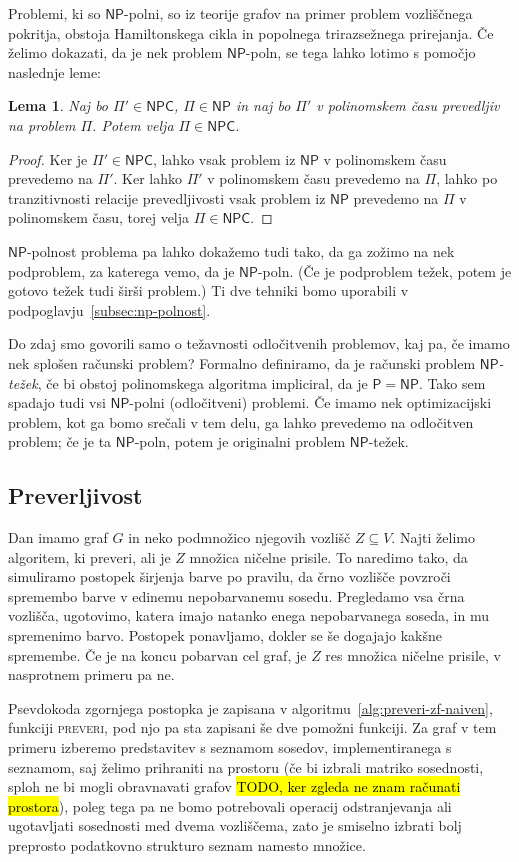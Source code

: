 \documentclass[12pt,a4paper,twoside]{article}
\theoremstyle{definition} %
\theoremstyle{plain} %
\newtheorem{lema}[definicija]{Lema}
\numberwithin{equation}{section}  %
\renewcommand{\P}{\ensuremath{\mathsf{P}}}
\newcommand{\NP}{\ensuremath{\mathsf{NP}}}
\newcommand{\NPC}{\ensuremath{\mathsf{NPC}}}
\begin{document}
Problemi, ki so $\NP$-polni, so iz teorije grafov na primer problem vozliščnega pokritja, obstoja Hamiltonskega cikla in popolnega trirazsežnega prirejanja. Če želimo dokazati, da je nek problem $\NP$-poln, se tega lahko lotimo s pomočjo naslednje leme:
\begin{lema}
    Naj bo $\Pi' \in \NPC$, $\Pi \in \NP$ in naj bo $\Pi'$ v polinomskem času prevedljiv na problem $\Pi$. Potem velja $\Pi \in \NPC$.
\end{lema}
\begin{proof}
    Ker je $\Pi' \in \NPC$, lahko vsak problem iz $\NP$ v polinomskem času prevedemo na $\Pi'$. Ker lahko $\Pi'$ v polinomskem času prevedemo na $\Pi$, lahko po tranzitivnosti relacije prevedljivosti vsak problem iz $\NP$ prevedemo na $\Pi$ v polinomskem času, torej velja $\Pi \in \NPC$.
\end{proof}
$\NP$-polnost problema pa lahko dokažemo tudi tako, da ga zožimo na nek podproblem, za katerega vemo, da je $\NP$-poln. (Če je podproblem težek, potem je gotovo težek tudi širši problem.)
Ti dve tehniki bomo uporabili v podpoglavju~\ref{subsec:np-polnost}.

Do zdaj smo govorili samo o težavnosti odločitvenih problemov, kaj pa, če imamo nek splošen računski problem? Formalno definiramo, da je računski problem \emph{$\NP$-težek}, če bi obstoj polinomskega algoritma impliciral, da je $\P = \NP$. Tako sem spadajo tudi vsi $\NP$-polni (odločitveni) problemi. Če imamo nek optimizacijski problem, kot ga bomo srečali v tem delu, ga lahko prevedemo na odločitven problem; če je ta $\NP$-poln, potem je originalni problem $\NP$-težek.

\subsection{Preverljivost}
Dan imamo graf $G$ in neko podmnožico njegovih vozlišč $Z \subseteq V$. Najti želimo algoritem, ki preveri, ali je $Z$ množica ničelne prisile. To naredimo tako, da simuliramo postopek širjenja barve po pravilu, da črno vozlišče povzroči spremembo barve v edinemu nepobarvanemu sosedu. Pregledamo vsa črna vozlišča, ugotovimo, katera imajo natanko enega nepobarvanega soseda, in mu spremenimo barvo. Postopek ponavljamo, dokler se še dogajajo kakšne spremembe. Če je na koncu pobarvan cel graf, je $Z$ res množica ničelne prisile, v nasprotnem primeru pa ne. 

Psevdokoda zgornjega postopka je zapisana v algoritmu~\ref{alg:preveri-zf-naiven}, funkciji \textsc{preveri}, pod njo pa sta zapisani še dve pomožni funkciji. Za graf v tem primeru izberemo predstavitev s seznamom sosedov, implementiranega s seznamom, saj želimo prihraniti na prostoru (če bi izbrali matriko sosednosti, sploh ne bi mogli obravnavati grafov \hl{TODO, ker zgleda ne znam računati prostora}), poleg tega pa ne bomo potrebovali operacij odstranjevanja ali ugotavljati sosednosti med dvema vozliščema, zato je smiselno izbrati bolj preprosto podatkovno strukturo seznam namesto množice. 
\end{document}
